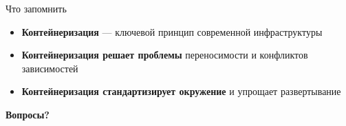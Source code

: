 \documentclass[aspectratio=169]{beamer}
\begin{document}
\begin{frame}{Что запомнить}
\begin{itemize}
\item \textbf{Контейнеризация} — ключевой принцип современной инфраструктуры
\item \textbf{Контейнеризация решает проблемы} переносимости и конфликтов зависимостей
\item \textbf{Контейнеризация стандартизирует окружение} и упрощает развертывание
\end{itemize}

\vspace{1cm}
\begin{center}
\textbf{Вопросы?}
\end{center}
\end{frame}
\end{document}
